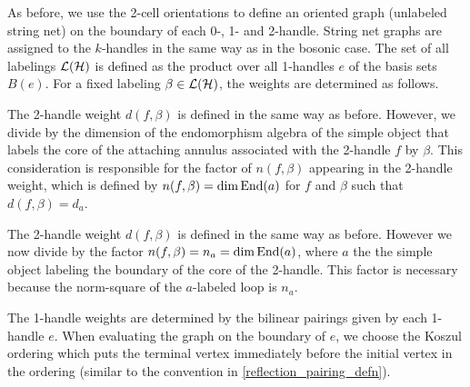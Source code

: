 As before, we use the 2-cell orientations to define an oriented graph (unlabeled string net) on the boundary of each 0-, 1- and 2-handle.
String net graphs are assigned to the $k$-handles in the same way as in the bosonic case. 
The set of all labelings $\mathcal{L}(\mathcal{H})$ is defined as the product over all 1-handles $e$ of the basis sets $B(e)$.
For a fixed labeling $\beta \in \mathcal{L}(\mathcal{H})$, the weights are determined as follows.

The 2-handle weight $d(f, \beta)$ is defined in the same way as before. However, 
we divide
by the dimension 
of the endomorphism algebra of the simple object that labels the core of the attaching annulus associated with the 2-handle $f$ by $\beta$. 
This consideration is responsible for the factor of $n(f,\beta)$ appearing 
in the 2-handle weight, 
which is defined by $n(f,\beta)=\dim \text{End}(a)$ for $f$ and $\beta$
such that $d(f,\beta)=d_a$. 

The 2-handle weight $d(f, \beta)$ is defined in the same way as before. 
However we now divide by the factor $n(f, \beta) = n_a = \dim\text{End}(a)$,
where $a$ the the simple object labeling the boundary of the core of the 2-handle.
This factor is necessary because the norm-square of the $a$-labeled loop is $n_a$.


The 1-handle weights are determined by the bilinear pairings given by each 1-handle $e$. 
When evaluating the graph on the boundary of $e$, we choose the Koszul ordering which puts the terminal vertex
immediately before the initial vertex in the ordering (similar to the convention in \eqref{reflection_pairing_defn}).


